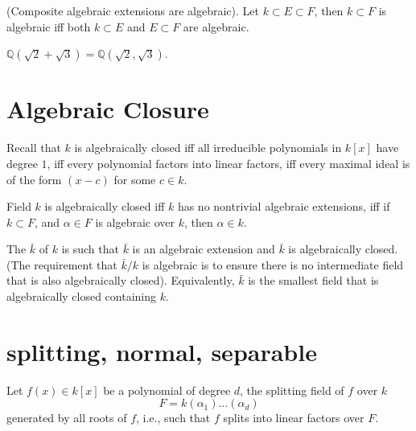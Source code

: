 \documentclass[openany]{book}
\newcommand{\Q}{\mathbb{Q}}
\begin{document}
\begin{prop}
    (Composite algebraic extensions are algebraic). Let $k\subset E\subset F$, then $k\subset F$ is algebraic iff both $k\subset E$ and $E\subset F$ are algebraic.
\end{prop}


\begin{example}
    $\Q(\sqrt{2}+\sqrt{3})=\Q(\sqrt{2},\sqrt{3})$.
\end{example}

\section{Algebraic Closure}

\begin{prop}
    Recall that $k$ is algebraically closed iff all irreducible polynomials in $k[x]$ have degree $1$, iff every polynomial factors into linear factors, iff every maximal ideal is of the form $(x-c)$ for some $c\in k$.
\end{prop}


\begin{prop}
    Field $k$ is algebraically closed iff $k$ has no nontrivial algebraic extensions, iff if $k\subset F$, and $\alpha\in F$ is algebraic over $k$, then $\alpha\in k$.
\end{prop}


\begin{defn}
    The $\bar{k}$ of $k$ is such that $\bar{k}$ is an algebraic extension and $\bar{k}$ is algebraically closed. (The requirement that $\bar{k}/k$ is algebraic is to ensure there is no intermediate field that is also algebraically closed). Equivalently, $\bar{k}$ is the smallest field that is algebraically closed containing $k$.
\end{defn}

\section{splitting, normal, separable}




\begin{defn}
    Let $f(x)\in k[x]$ be a polynomial of degree $d$, the splitting field of $f$ over $k$ 
    \begin{equation*}
        F=k(\alpha_1)\dots(\alpha_d)
    \end{equation*}
    generated by all roots of $f$, i.e., such that $f$ splits into linear factors over $F$.
\end{defn}
\end{document}
